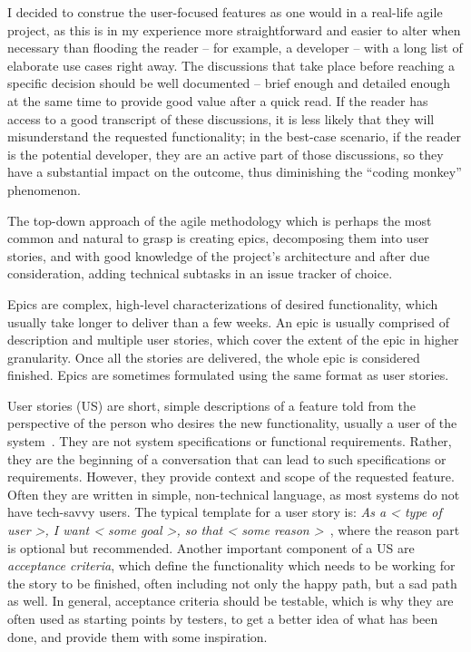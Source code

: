 I decided to construe the user-focused features as one would in a real-life agile project,
as this is in my experience more straightforward and easier to alter when necessary than flooding the reader -- for example, a developer -- with a long list of elaborate use cases right away.
The discussions that take place before reaching a specific decision should be well documented -- brief enough and detailed enough at the same time to provide good value after a quick read.
If the reader has access to a good transcript of these discussions, it is less likely that they will misunderstand the requested functionality;
in the best-case scenario, if the reader is the potential developer, they are an active part of those discussions, so they have a substantial impact on the outcome, thus diminishing the ``coding monkey'' phenomenon.

The top-down approach of the agile methodology which is perhaps the most common and natural to grasp is creating epics, decomposing them into user stories,
and with good knowledge of the project's architecture and after due consideration, adding technical subtasks in an issue tracker of choice.

Epics are complex, high-level characterizations of desired functionality, which usually take longer to deliver than a few weeks.
An epic is usually comprised of description and multiple user stories, which cover the extent of the epic in higher granularity.
Once all the stories are delivered, the whole epic is considered finished.
Epics are sometimes formulated using the same format as user stories.

User stories (US) are short, simple descriptions of a feature told from the perspective of the person who desires the new functionality, usually a user of the system~\cite{user-story-definition}.
They are not system specifications or functional requirements.
Rather, they are the beginning of a conversation that can lead to such specifications or requirements.
However, they provide context and scope of the requested feature.
Often they are written in simple, non-technical language, as most systems do not have tech-savvy users.
The typical template for a user story is:
\textit{As a < type of user >, I want < some goal >, so that < some reason >}~\cite{user-story-definition}, where the reason part is optional but recommended.
Another important component of a US are \textit{acceptance criteria}, which define the functionality which needs to be working for the story to be finished, often including not only the happy path, but a sad path as well.
In general, acceptance criteria should be testable, which is why they are often used as starting points by testers, to get a better idea of what has been done, and provide them with some inspiration.

